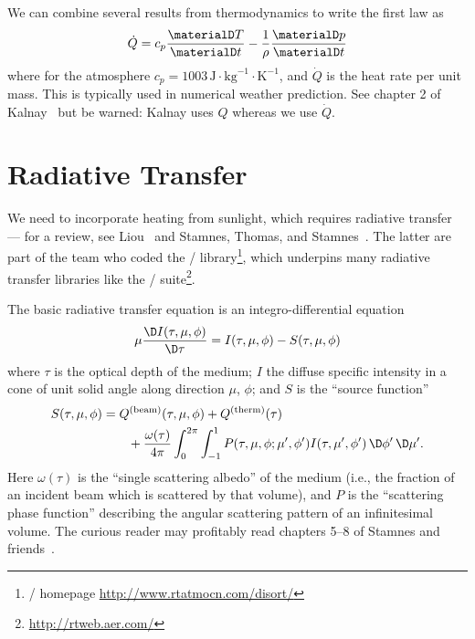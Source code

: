 \begin{rmk}
  We can combine several results from thermodynamics to write the first
  law as
  \begin{equation}
    \dot{Q} = c_{p}\frac{\materialD T}{\materialD t} - \frac{1}{\rho}\frac{\materialD p}{\materialD t}
  \end{equation}
  where for the atmosphere
  $c_{p}=1003\,\mathrm{J}\cdot\mathrm{kg}^{-1}\cdot\mathrm{K}^{-1}$, and
  $\dot{Q}$ is the heat rate per unit mass. This is typically used in
  numerical weather prediction. See chapter 2 of
  Kalnay~\cite{kalnay_2002} but be warned: Kalnay uses $Q$ whereas we
  use $\dot{Q}$.
\end{rmk}

\section{Radiative Transfer}

We need to incorporate heating from sunlight, which requires radiative
transfer --- for a review, see Liou~\cite{liou2002introduction} and
Stamnes, Thomas, and Stamnes~\cite{stamnes_thomas_stamnes_2017}.
The latter are part of the team who coded the \DISORT/\index{\DISORT/}
library\footnote{\DISORT/ homepage \url{http://www.rtatmocn.com/disort/}},
which underpins many radiative transfer libraries like the
\RRTM/\index{\RRTM/} suite\footnote{\url{http://rtweb.aer.com/}}.

The basic radiative transfer equation is an integro-differential
equation
\begin{equation}\label{eq:integro-diff-radiative-transfer}
  \mu\frac{\D I(\tau,\mu,\phi)}{\D\tau}
  = I(\tau, \mu, \phi) - S(\tau, \mu, \phi)
\end{equation}
where $\tau$ is the optical depth of the medium; $I$ the diffuse
specific intensity in a cone of unit solid angle along direction $\mu$,
$\phi$; and $S$ is the ``source function''
\begin{equation}
  \begin{split}
    S(\tau, \mu, \phi) &= Q^{\text{(beam)}}(\tau,\mu,\phi)  + Q^{\text{(therm)}}(\tau) \\
    &\qquad + \frac{\omega(\tau)}{4\pi}
  \int^{2\pi}_{0}\int^{1}_{-1} P(\tau,\mu,\phi;\mu',\phi')I(\tau,\mu',\phi')\,\D\phi'\,\D\mu'.
  \end{split}
\end{equation}
Here $\omega(\tau)$ is the ``single scattering albedo'' of the medium
(i.e., the fraction of an incident beam which is scattered by that
volume), and $P$ is the ``scattering phase function'' describing the
angular scattering pattern of an infinitesimal volume. The curious
reader may profitably read chapters 5--8 of Stamnes and
friends~\cite{stamnes_thomas_stamnes_2017}.

